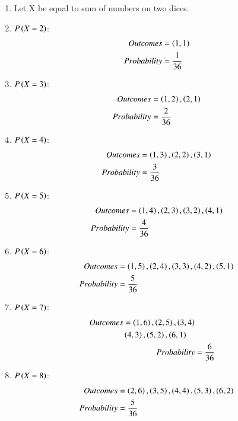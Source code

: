 \renewcommand{\theequation}{\theenumi}
\begin{enumerate}

\item Let X be equal to sum of numbers on two dices.

\item $P\left(X=2\right)$:
\begin{align}
Outcomes  &= \left(1,1\right) \\
Probability &= \frac{1}{36}
\end{align}

\item $P\left(X=3\right)$:
\begin{align}
Outcomes  &= \left(1,2\right), \left(2,1\right) \\
Probability &= \frac{2}{36}
\end{align}

\item $P\left(X=4\right)$:
\begin{align}
Outcomes  &= \left(1,3\right), \left(2,2\right), \left(3,1\right)  \\
Probability &= \frac{3}{36}
\end{align}

\item $P\left(X=5\right)$:
\begin{align}
Outcomes  &= \left(1,4\right), \left(2,3\right), \left(3,2\right), \left(4,1\right) \\
Probability &= \frac{4}{36}
\end{align}

\item $P\left(X=6\right)$:
\begin{align}
Outcomes  &= \left(1,5\right), \left(2,4\right), \left(3,3\right), \left(4,2\right), \left(5,1\right) \\
Probability &= \frac{5}{36}
\end{align}

\item $P\left(X=7\right)$:
\begin{align}
\begin{split}
Outcomes  &= \left(1,6\right), \left(2,5\right), \left(3,4\right)\\
&\left(4,3\right), \left(5,2\right), \left(6,1\right) 
\end{split}\\
Probability &= \frac{6}{36}
\end{align}

\item $P\left(X=8\right)$:
\begin{align}
Outcomes  &= \left(2,6\right), \left(3,5\right), \left(4,4\right), \left(5,3\right), \left(6,2\right) \\
Probability &= \frac{5}{36}
\end{align}


\end{enumerate}
